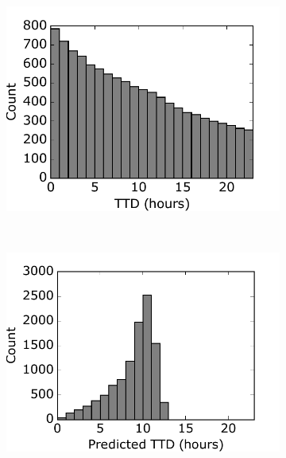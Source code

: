\documentclass[pdftex,12pt,a4paper]{report}
\begin{document}
\begin{figure}[H]
\centering

\begin{subfigure}{.3\textwidth}
  \centering
  \includegraphics[width=\textwidth]{images/svm/ttd_dist.pdf}
  \caption{}
  \label{fig:svm_ttd_dist}
\end{subfigure}
~
\begin{subfigure}{.3\textwidth}
  \centering
  \includegraphics[width=\textwidth]{images/svm/pred_ttd_dist.pdf}
  \caption{}
  \label{fig:pred_ttd_dist}
\end{subfigure}
~
\begin{subfigure}{.3\textwidth}
  \centering

\end{subfigure}
\end{figure}
\end{document}

